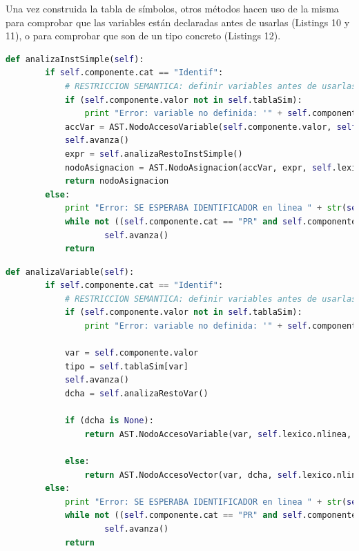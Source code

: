 \documentclass[11pt]{article}
\begin{document}
Una vez construida la tabla de símbolos, otros métodos hacen uso de la misma para comprobar que las variables están declaradas antes de usarlas (Listings 10 y 11), o para comprobar que son de un tipo concreto (Listings 12).

\begin{minipage}{\linewidth}

\begin{lstlisting}[language=Python, caption=analizaInstSimple()]
	def analizaInstSimple(self):
        if self.componente.cat == "Identif":
		    # RESTRICCION SEMANTICA: definir variables antes de usarlas
            if (self.componente.valor not in self.tablaSim):
                print "Error: variable no definida: '" + self.componente.valor + "' en linea " + str(self.componente.linea)
            accVar = AST.NodoAccesoVariable(self.componente.valor, self.lexico.nlinea, self.tablaSim[self.componente.valor])
            self.avanza()
            expr = self.analizaRestoInstSimple()
            nodoAsignacion = AST.NodoAsignacion(accVar, expr, self.lexico.nlinea)
            return nodoAsignacion
        else: 
            print "Error: SE ESPERABA IDENTIFICADOR en linea " + str(self.lexico.nlinea)
            while not ((self.componente.cat == "PR" and self.componente.valor == "SINO") or self.componente.cat == "PtoComa"):
                    self.avanza()
            return
    \end{lstlisting}
\end{minipage}

\begin{minipage}{\linewidth}
    \begin{lstlisting}[language=Python, caption=analizaVariable()]          
    def analizaVariable(self):
        if self.componente.cat == "Identif":
            # RESTRICCION SEMANTICA: definir variables antes de usarlas
            if (self.componente.valor not in self.tablaSim):
                print "Error: variable no definida: '" + self.componente.valor + "' en linea " + str(self.componente.linea)

            var = self.componente.valor
            tipo = self.tablaSim[var]
            self.avanza()
            dcha = self.analizaRestoVar()
    
            if (dcha is None):
                return AST.NodoAccesoVariable(var, self.lexico.nlinea, tipo)

            else:
                return AST.NodoAccesoVector(var, dcha, self.lexico.nlinea)
        else:
            print "Error: SE ESPERABA IDENTIFICADOR en linea " + str(self.lexico.nlinea)
            while not ((self.componente.cat == "PR" and self.componente.valor in ["Y","O", "ENTONCES", "HACER", "SINO"]) or self.componente.cat == "OpRel" or self.componente.cat == "OpAdd" or self.componente.cat == "OpMult" or self.componente.cat == "CorCi" or self.componente.cat == "ParentCi" or self.componente.cat == "PtoComa"):
                    self.avanza()
            return
	\end{lstlisting}
\end{minipage}
\end{document}
